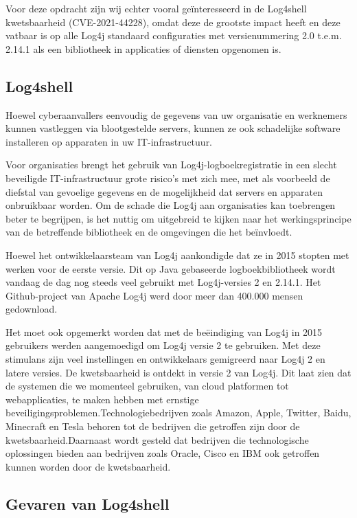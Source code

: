 \documentclass{hogent-article}
\begin{document}
Voor deze opdracht zijn wij echter vooral geïnteresseerd in de Log4shell kwetsbaarheid (CVE-2021-44228), omdat deze de grootste impact heeft en deze vatbaar is op alle Log4j standaard configuraties met versienummering 2.0 t.e.m. 2.14.1 als een bibliotheek in applicaties of diensten opgenomen is.

\subsection{Log4shell}

Hoewel cyberaanvallers eenvoudig de gegevens van uw organisatie en werknemers kunnen vastleggen via blootgestelde servers, kunnen ze ook schadelijke software installeren op apparaten in uw IT-infrastructuur.

Voor organisaties brengt het gebruik van Log4j-logboek\-registratie in een slecht beveiligde IT-infrastructuur grote risico's met zich mee, met als voorbeeld de diefstal van gevoelige gegevens en de mogelijkheid dat servers en apparaten onbruikbaar worden. Om de schade die Log4j aan organisaties kan toebrengen beter te begrijpen, is het nuttig om uitgebreid te kijken naar het werkingsprincipe van de betreffende bibliotheek en de omgevingen die het beïnvloedt.

Hoewel het ontwikkelaarsteam van Log4j aankondigde dat ze in 2015 stopten met werken voor de eerste versie. Dit op Java gebaseerde logboekbibliotheek wordt vandaag de dag nog steeds veel gebruikt met Log4j-versies 2 en 2.14.1. Het Github-project van Apache Log4j werd door meer dan 400.000 mensen gedownload.

Het moet ook opgemerkt worden dat met de beëindiging van Log4j in 2015 gebruikers werden aangemoedigd om Log4j versie 2 te gebruiken. Met deze stimulans zijn veel instellingen en ontwikkelaars gemigreerd naar Log4j 2 en latere versies. De kwetsbaarheid is ontdekt in versie 2 van Log4j. Dit laat zien dat de systemen die we momenteel gebruiken, van cloud platformen tot webapplicaties, te maken hebben met ernstige beveiligingsproblemen.Technologiebedrijven zoals Amazon, Apple, Twitter, Baidu, Minecraft en Tesla behoren tot de bedrijven die getroffen zijn door de kwetsbaarheid.Daarnaast wordt gesteld dat bedrijven die technologische oplossingen bieden aan bedrijven zoals Oracle, Cisco en IBM ook getroffen kunnen worden door de kwetsbaarheid.

\subsection{Gevaren van Log4shell}
\end{document}
